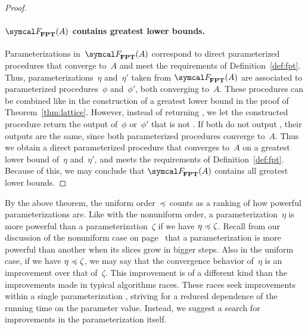 \begin{proof}
  \paragraph{$\calF_\cl{FPT}(A)$ contains greatest lower bounds.}
  Parameterizations in~$\calF_\cl{FPT}(A)$ correspond to direct parameterized procedures that converge to~$A$ and meet the requirements of Definition~\ref{def:fpt}.
  Thus, parameterizations~$\eta$ and~$\eta'$ taken from $\calF_\cl{FPT}(A)$ are associated to parameterized procedures~$\phi$ and~$\phi'$, both converging to~$A$.
  These procedures can be combined like in the construction of a greatest lower bound in the proof of Theorem~\ref{thm:lattice}.
  However, instead of returning , we let the constructed procedure return the output of~$\phi$ or~$\phi'$ that is not .
  If both do not output , their outputs are the same, since both parameterized procedures converge to~$A$.
  Thus we obtain a direct parameterized procedure that converges to~$A$ on a greatest lower bound of~$\eta$ and~$\eta'$, and meets the requirements of Definition~\ref{def:fpt}.
  Because of this, we may conclude that $\calF_\cl{FPT}(A)$ contains all greatest lower bounds.
\end{proof}

By the above theorem, the uniform order~$\preccurlyeq$ counts as a ranking of how powerful parameterizations are.
Like with the nonuniform order, a parameterization~$\eta$ is more powerful than a parameterization~$\zeta$ if we have $\eta \preccurlyeq \zeta$.
Recall from our discussion of the nonuniform case on page~\pageref{p:powerful_nuparameterizations} that a parameterization is more powerful than another when its slices grow in bigger steps.
Also in the uniform case, if we have $\eta \preccurlyeq \zeta$, we may say that the convergence behavior of~$\eta$ is an improvement over that of~$\zeta$.
This improvement is of a different kind than the improvements made in typical algorithms races.
These races seek improvements within a single parameterization \parencite{komusiewicz2012new,fellows2013towards}, striving for a reduced dependence of the running time on the parameter value.
Instead, we suggest a search for improvements in the parameterization itself.


